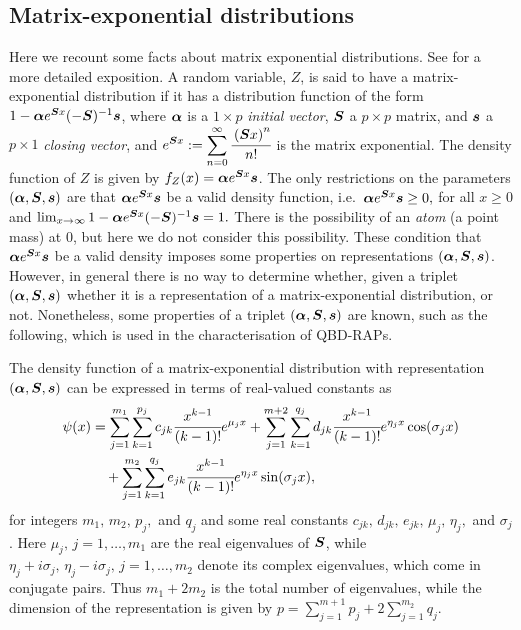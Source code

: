 \subsection{Matrix-exponential distributions}
Here we recount some facts about matrix exponential distributions. See \citep{MEinAP} for a more detailed exposition. A random variable, \(Z\), is said to have a matrix-exponential distribution if it has a distribution function of the form \(1-\boldsymbol \alpha e^{\boldsymbol Sx}(-\boldsymbol S)^{-1}\boldsymbol s\), where \(\boldsymbol \alpha\) is a \(1\times p\) \emph{initial vector}, \(\boldsymbol S\) a \(p\times p\) matrix, and \(\boldsymbol s\) a \(p\times 1\) \emph{closing vector}, and \(\displaystyle e^{\boldsymbol S x} := \sum_{n=0}^\infty \cfrac{\left(\boldsymbol Sx\right)^n}{n!}\) is the matrix exponential. The density function of \(Z\) is given by \(f_Z(x) = \boldsymbol\alpha e^{\boldsymbol S x}\boldsymbol s\). The only restrictions on the parameters \((\boldsymbol \alpha, \boldsymbol S, \boldsymbol s)\) are that \(\boldsymbol \alpha e^{\boldsymbol S x} \boldsymbol s\) be a valid density function, i.e.~\(\boldsymbol \alpha e^{\boldsymbol S x} \boldsymbol s\geq 0,\) for all \(x\geq 0\) and \(\lim_{x\to\infty} 1-\boldsymbol \alpha e^{\boldsymbol Sx}(-\boldsymbol S)^{-1}\boldsymbol s = 1.\) There is the possibility of an \emph{atom} (a point mass) at 0, but here we do not consider this possibility. These condition that \(\boldsymbol \alpha e^{\boldsymbol Sx}\boldsymbol s\) be a valid density imposes some properties on representations \((\boldsymbol \alpha, \boldsymbol S, \boldsymbol s)\). However, in general there is no way to determine whether, given a triplet \((\boldsymbol \alpha, \boldsymbol S, \boldsymbol s)\) whether it is a representation of a matrix-exponential distribution, or not. Nonetheless, some properties of a triplet \((\boldsymbol \alpha, \boldsymbol S, \boldsymbol s)\) are known, such as the following, which is used in the characterisation of QBD-RAPs. 
\begin{thm}
	The density function of a matrix-exponential distribution with representation \((\boldsymbol\alpha, \boldsymbol S, \boldsymbol s)\) can be expressed in terms of real-valued constants as 
	\begin{align}
		\psi(x)&=\sum_{j=1}^{m_1} \sum_{k=1}^{p_j} c_{jk} \cfrac{x^{k-1}}{(k-1)!} e^{\mu_jx} + \sum_{j=1}^{m+2}\sum_{k=1}^{q_j} d_{jk}\cfrac{x^{k-1}}{(k-1)!}e^{\eta_jx}\cos(\sigma_jx) \nonumber 
		\\&\quad{}+ \sum_{j=1}^{m_2}\sum_{k=1}^{q_j}e_{jk}\cfrac{x^{k-1}}{(k-1)!}e^{\eta_jx}\sin(\sigma_jx), \label{eqn: spec}
	\end{align}
	for integers \(m_1,\,m_2,\,p_j,\) and \(q_j\) and some real constants \(c_{jk},\,d_{jk},\,e_{jk},\,\mu_j,\,\eta_j,\) and \(\sigma_j\). Here \(\mu_j,\, j=1,\dots,m_1\) are the real eigenvalues of \(\boldsymbol S\), while \(\eta_j+i\sigma_j, \, \eta_j-i\sigma_j,\, j=1,\dots,m_2\) denote its complex eigenvalues, which come in conjugate pairs. Thus \(m_1+2m_2\) is the total number of eigenvalues, while the dimension of the representation is given by \(\displaystyle p=\sum_{j=1}^{m+1}p_j + 2\sum_{j=1}^{m_2}q_j\). 
\end{thm}
